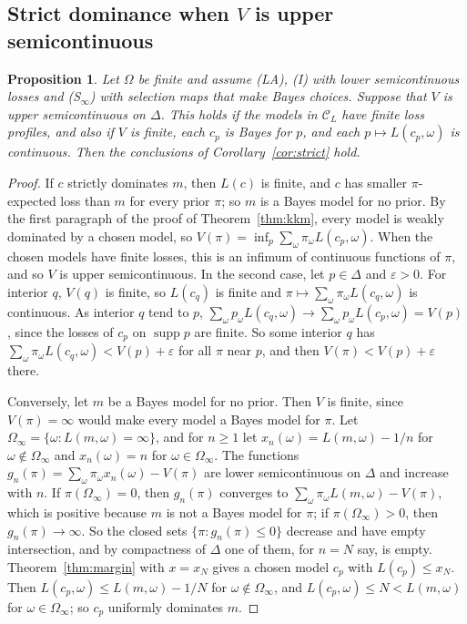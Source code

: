\documentclass[11pt]{article}
\newtheorem{proposition}[theorem]{Proposition}
\theoremstyle{definition}
\theoremstyle{remark}
\newcommand{\C}{\mathcal C}
\newcommand{\supp}{\operatorname{supp}}
\begin{document}
\subsection{Strict dominance when $V$ is upper semicontinuous}\label{sec:strictproof}
\begin{proposition}\label{prop:strict-general}
Let $\Omega$ be finite and assume (LA), (I) with lower semicontinuous losses and (S$_\infty$) with selection maps that make Bayes choices. Suppose that $V$ is upper semicontinuous on $\Delta$. This holds if the models in $\C_L$ have finite loss profiles, and also if $V$ is finite, each $c_p$ is Bayes for $p$, and each $p\mapsto L(c_p,\omega)$ is continuous. Then the conclusions of Corollary~\ref{cor:strict} hold.
\end{proposition}
\begin{proof}
If $c$ strictly dominates $m$, then $L(c)$ is finite, and $c$ has smaller $\pi$-expected loss than $m$ for every prior $\pi$; so $m$ is a Bayes model for no prior. By the first paragraph of the proof of Theorem~\ref{thm:kkm}, every model is weakly dominated by a chosen model, so $V(\pi)=\inf_p\sum_\omega\pi_\omega L(c_p,\omega)$. When the chosen models have finite losses, this is an infimum of continuous functions of $\pi$, and so $V$ is upper semicontinuous. In the second case, let $p\in\Delta$ and $\varepsilon>0$. For interior $q$, $V(q)$ is finite, so $L(c_q)$ is finite and $\pi\mapsto\sum_\omega\pi_\omega L(c_q,\omega)$ is continuous. As interior $q$ tend to $p$, $\sum_\omega p_\omega L(c_q,\omega)\to\sum_\omega p_\omega L(c_p,\omega)=V(p)$, since the losses of $c_p$ on $\supp p$ are finite. So some interior $q$ has $\sum_\omega\pi_\omega L(c_q,\omega)<V(p)+\varepsilon$ for all $\pi$ near $p$, and then $V(\pi)<V(p)+\varepsilon$ there.

Conversely, let $m$ be a Bayes model for no prior. Then $V$ is finite, since $V(\pi)=\infty$ would make every model a Bayes model for $\pi$. Let $\Omega_\infty=\{\omega:L(m,\omega)=\infty\}$, and for $n\ge1$ let $x_n(\omega)=L(m,\omega)-1/n$ for $\omega\notin\Omega_\infty$ and $x_n(\omega)=n$ for $\omega\in\Omega_\infty$. The functions $g_n(\pi)=\sum_\omega\pi_\omega x_n(\omega)-V(\pi)$ are lower semicontinuous on $\Delta$ and increase with $n$. If $\pi(\Omega_\infty)=0$, then $g_n(\pi)$ converges to $\sum_\omega\pi_\omega L(m,\omega)-V(\pi)$, which is positive because $m$ is not a Bayes model for $\pi$; if $\pi(\Omega_\infty)>0$, then $g_n(\pi)\to\infty$. So the closed sets $\{\pi:g_n(\pi)\le0\}$ decrease and have empty intersection, and by compactness of $\Delta$ one of them, for $n=N$ say, is empty. Theorem~\ref{thm:margin} with $x=x_N$ gives a chosen model $c_p$ with $L(c_p)\le x_N$. Then $L(c_p,\omega)\le L(m,\omega)-1/N$ for $\omega\notin\Omega_\infty$, and $L(c_p,\omega)\le N<L(m,\omega)$ for $\omega\in\Omega_\infty$; so $c_p$ uniformly dominates $m$.
\end{proof}
\end{document}
